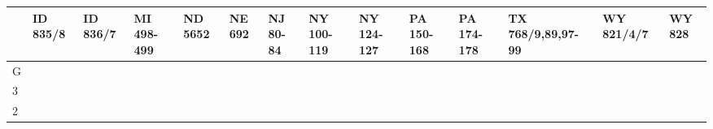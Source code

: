 \documentclass{article}
\begin{document}
\begin{table}
\normalsize{}
\begin{tabular}{@{}llllllllllllll@{}}
\toprule
 & ID 835/8           & ID 836/7           & MI 498-499         & ND 5652           & NE 692             & NJ 80-84           & NY 100-119       & NY 124-127       & PA 150-168         & PA 174-178         & TX 768/9,89,97-99  & WY 821/4/7       & WY 828           \\ \midrule
G & \cellcolor{yellow} & \cellcolor{orange} & \cellcolor{orange} & \cellcolor{green} & \cellcolor{purple} & \cellcolor{yellow} & \cellcolor{red}  & \cellcolor{red}  & \cellcolor{yellow} & \cellcolor{orange} & \cellcolor{purple} & \cellcolor{grey} & \cellcolor{grey} \\ \hline
3 & \cellcolor{blue}   & \cellcolor{blue}   & \cellcolor{orange} & \cellcolor{green} & \cellcolor{purple} & \cellcolor{yellow} & \cellcolor{blue} & \cellcolor{blue} & \cellcolor{yellow} & \cellcolor{orange} & \cellcolor{blue}   & \cellcolor{grey} & \cellcolor{blue} \\ \hline
2 & \cellcolor{blue}   & \cellcolor{blue}   & \cellcolor{orange} & \cellcolor{green} & \cellcolor{purple} & \cellcolor{blue}   & \cellcolor{blue} & \cellcolor{blue} & \cellcolor{yellow} & \cellcolor{blue}   & \cellcolor{blue}   & \cellcolor{blue} & \cellcolor{blue} \\ \bottomrule
\end{tabular}
\vspace{1ex}

\end{table}
\end{document}
